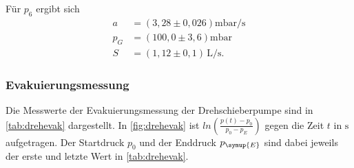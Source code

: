 Für $p_6$ ergibt sich
\begin{align*}
  a &= (3,28 \pm 0,026) \si{\milli\bar\per\second} \\
  p_G &= (100,0 \pm 3,6) \si{\milli\bar} \\
  S &= (1,12 \pm 0,1)\,\si{\liter\per\second}.
\end{align*}


\subsubsection{Evakuierungsmessung}
Die Messwerte der Evakuierungsmessung der Drehschieberpumpe sind in \autoref{tab:drehevak} dargestellt. In
\autoref{fig:drehevak} ist $ln(\frac{p(t)-p_0}{p_0 - p_E})$ gegen die Zeit $t$ in $\si{\second}$ aufgetragen. Der
Startdruck $p_{0}$ und der Enddruck $p_{\symup{E}}$ sind dabei jeweils der erste und letzte Wert in
\autoref{tab:drehevak}.

